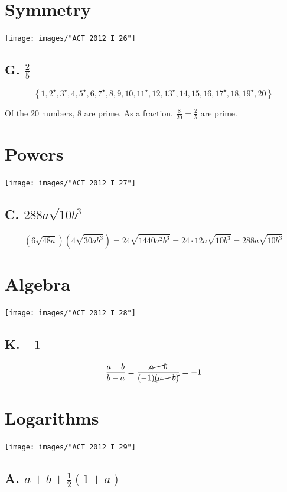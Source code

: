 \documentclass[11pt, oneside]{article}
\begin{document}
\section{Symmetry}
\texttt{[image: images/"ACT 2012 I 26"]}
\subsection{G. $\frac{2}{5}$}

$$\left\{ 1, 2^{\star}, 3^{\star}, 4, 5^{\star}, 6, 7^{\star}, 8, 9, 10, 11^{\star}, 12, 13^{\star}, 14, 15, 16, 17^{\star}, 18, 19^{\star}, 20 \right\}$$

Of the $20$ numbers, $8$ are prime. As a fraction, $\frac{8}{20} = \frac{2}{5}$ are prime.

\section{Powers}
\texttt{[image: images/"ACT 2012 I 27"]}
\subsection{C. $288a\sqrt{10b^{3}}$}

$$\left(6\sqrt{48a}\right)\left(4\sqrt{30ab^{3}}\right) = 24 \sqrt{1440a^{2}b^{3}} = 24\cdot 12 a \sqrt{10b^{3}} = 288a\sqrt{10b^{3}}$$

\section{Algebra}
\texttt{[image: images/"ACT 2012 I 28"]}
\subsection{K. $-1$}

$$\frac{a-b}{b-a} = \frac{\cancel{a-b}}{(-1)\cancel{(a-b)}} = -1$$


\section{Logarithms}
\texttt{[image: images/"ACT 2012 I 29"]}
\subsection{A. $a+b+\frac{1}{2}(1+a)$}
\end{document}

